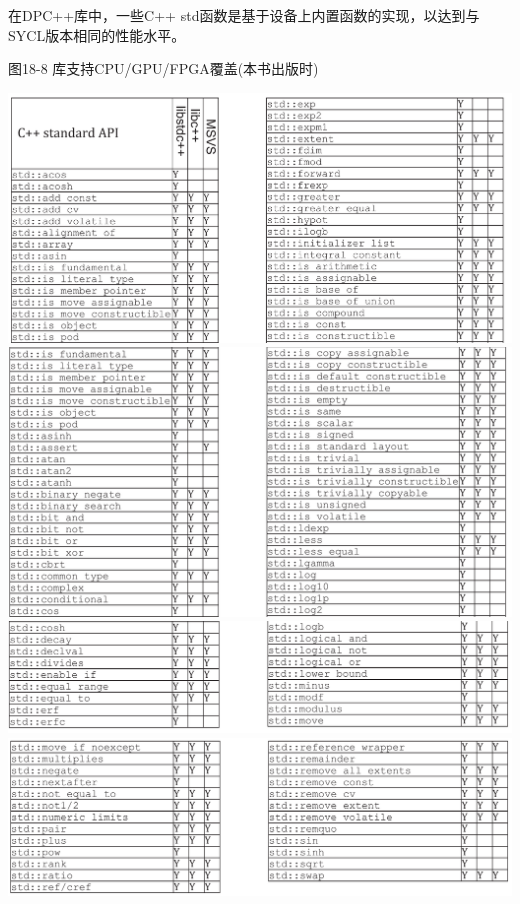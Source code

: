 在DPC++库中，一些C++ std函数是基于设备上内置函数的实现，以达到与SYCL版本相同的性能水平。\par

\hspace*{\fill} \par %
图18-8 库支持CPU/GPU/FPGA覆盖(本书出版时)
\begin{center}
	\includegraphics[width=1.0\textwidth]{content/chapter-18/images/7}
	\includegraphics[width=1.0\textwidth]{content/chapter-18/images/8}
	\includegraphics[width=1.0\textwidth]{content/chapter-18/images/9}
	\includegraphics[width=1.0\textwidth]{content/chapter-18/images/10}
\end{center}


